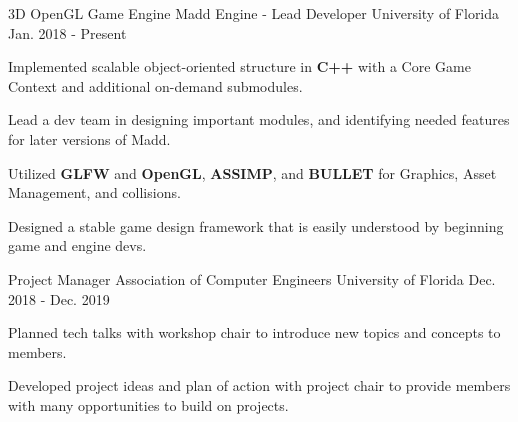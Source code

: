 


\begin{cventries}


\cventry
{3D OpenGL Game Engine} %
{Madd Engine - Lead Developer} %
{University of Florida} %
{Jan. 2018 - Present} %
{ %
	\begin{cvitems}
		\setlength{\itemindent}{.125in}
		\item {Implemented scalable object-oriented structure in \textbf{C++} with a Core Game Context and additional on-demand submodules.}
		\item {Lead a dev team in designing important modules, and identifying needed features for later versions of Madd.}
		\item {Utilized \textbf{GLFW} and \textbf{OpenGL}, \textbf{ASSIMP}, and \textbf{BULLET} for Graphics, Asset Management, and collisions.}
		\item {Designed a stable game design framework that is easily understood by beginning game and engine devs.}
	\end{cvitems}
}


\cventry
{Project Manager} %
{Association of Computer Engineers} %
{University of Florida} %
{Dec. 2018 - Dec. 2019} %
{ %
	\begin{cvitems}
		\setlength{\itemindent}{.125in}
		\item {Planned tech talks with workshop chair to introduce new topics and concepts to members.}
		\item {Developed project ideas and plan of action with project chair to provide members with many opportunities to build on projects.}
	\end{cvitems}
}


\end{cventries}
